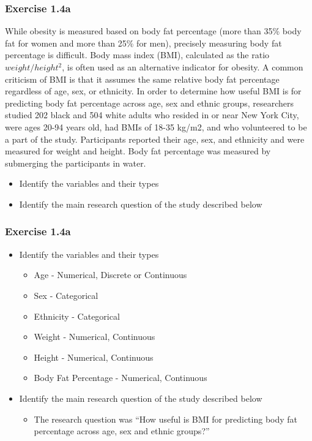 \documentclass[mathserif]{beamer}
\begin{document}
\begin{frame}[t]
\frametitle{Exercise 1.4a}
\small
While obesity is measured based on body fat percentage (more than 35\% body fat for women and more than 25\% for men), precisely measuring body fat percentage is difficult. Body mass index (BMI), calculated as the ratio $weight/height^2$, is often used as an alternative indicator for obesity. A common criticism of BMI is that it assumes the same relative body fat percentage regardless of age, sex, or ethnicity. In order to determine how useful BMI is for predicting body fat percentage across age, sex and ethnic groups, researchers studied 202 black and 504 white adults who resided in or near New York City, were ages 20-94 years old, had BMIs of 18-35 kg/m2, and who volunteered to be a part of the study. Participants reported their age, sex, and ethnicity and were measured for weight and height. Body fat percentage was measured by submerging the participants in water.
\begin{itemize}
	\item{Identify the variables and their types}
	\item{Identify the main research question of the study described below}
\end{itemize}
\end{frame}

\begin{frame}[t]
\frametitle{Exercise 1.4a}
\begin{itemize}
	\item{Identify the variables and their types}
	\begin{itemize}
		\item<2->{Age - Numerical, Discrete or Continuous}
		\item<2->{Sex - Categorical}
		\item<2->{Ethnicity - Categorical}
		\item<2->{Weight - Numerical, Continuous}
		\item<2->{Height - Numerical, Continuous}
		\item<2->{Body Fat Percentage - Numerical, Continuous}
	\end{itemize}
	\item{Identify the main research question of the study described below}
	\begin{itemize}
		\item<3->{The research question was “How useful is BMI for predicting body fat percentage across age, sex and ethnic groups?”}
	\end{itemize}
\end{itemize}
\end{frame}
\end{document}
